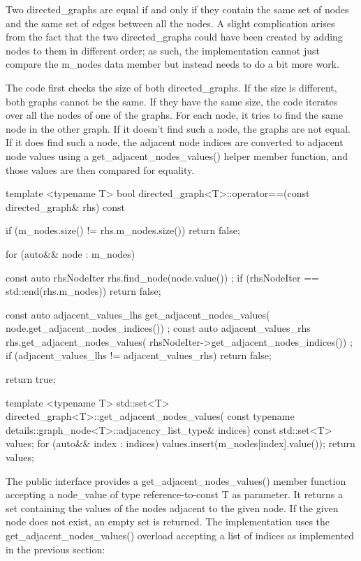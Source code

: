 Two directed\_graphs are equal if and only if they contain the same set of nodes and the same set of edges between all the nodes. A slight complication arises from the fact that the two directed\_graphs could have been created by adding nodes to them in different order; as such, the implementation cannot just compare the m\_nodes data member but instead needs to do a bit more work.

The code first checks the size of both directed\_graphs. If the size is different, both graphs cannot be the same. If they have the same size, the code iterates over all the nodes of one of the graphs. For each node, it tries to find the same node in the other graph. If it doesn’t find such a node, the graphs are not equal. If it does find such a node, the adjacent node indices are converted to adjacent node values using a get\_adjacent\_nodes\_values() helper member function, and those values are then compared for equality.

\begin{cpp}
template <typename T>
bool directed_graph<T>::operator==(const directed_graph& rhs) const
{
    if (m_nodes.size() != rhs.m_nodes.size()) { return false; }

    for (auto&& node : m_nodes) {
        const auto rhsNodeIter { rhs.find_node(node.value()) };
        if (rhsNodeIter == std::end(rhs.m_nodes)) { return false; }

        const auto adjacent_values_lhs { get_adjacent_nodes_values(
            node.get_adjacent_nodes_indices()) };
        const auto adjacent_values_rhs { rhs.get_adjacent_nodes_values(
            rhsNodeIter->get_adjacent_nodes_indices()) };
        if (adjacent_values_lhs != adjacent_values_rhs) { return false; }
    }
    return true;
}

template <typename T>
std::set<T> directed_graph<T>::get_adjacent_nodes_values(
    const typename details::graph_node<T>::adjacency_list_type& indices) const
{
    std::set<T> values;
    for (auto&& index : indices) { values.insert(m_nodes[index].value()); }
    return values;
}
\end{cpp}


The public interface provides a get\_adjacent\_nodes\_values() member function accepting a node\_value of type reference-to-const T as parameter. It returns a set containing the values of the nodes adjacent to the given node. If the given node does not exist, an empty set is returned. The implementation uses the get\_adjacent\_nodes\_values() overload accepting a list of indices as implemented in the previous section:

